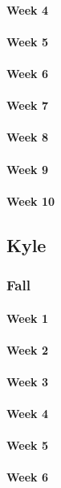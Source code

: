 \documentclass[draftclsnofoot, onecolumn, compsoc, 10pt]{IEEEtran}
\begin{document}
\paragraph{Week 4}
\paragraph{Week 5}
\paragraph{Week 6}
\paragraph{Week 7}
\paragraph{Week 8}
\paragraph{Week 9}
\paragraph{Week 10}
\subsection{Kyle}
\subsubsection{Fall}
\paragraph{Week 1}
\paragraph{Week 2}
\paragraph{Week 3}
\paragraph{Week 4}
\paragraph{Week 5}
\paragraph{Week 6}
\end{document}
